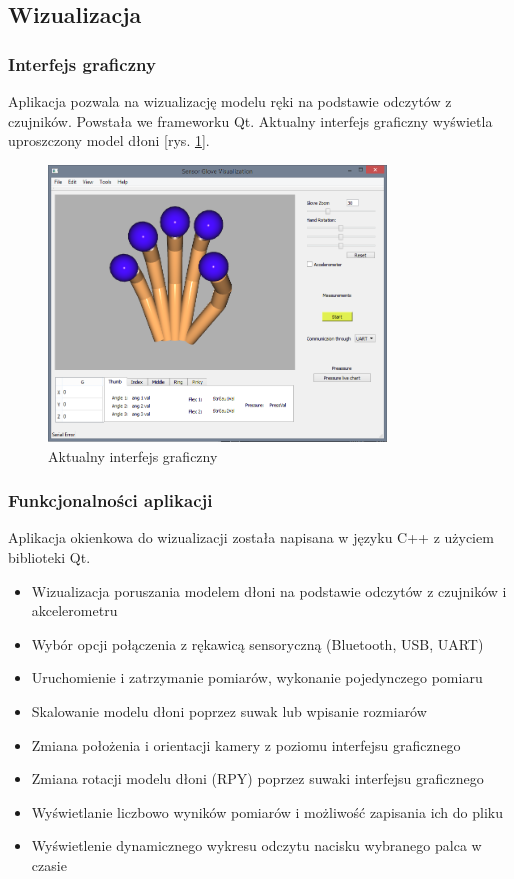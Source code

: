 \documentclass[12pt,a4paper]{article}
\begin{document}
\subsection{Wizualizacja}
\subsubsection{Interfejs graficzny}
Aplikacja pozwala na wizualizację modelu ręki na podstawie odczytów z czujników. Powstała we frameworku Qt. Aktualny interfejs graficzny wyświetla uproszczony model dłoni [rys. \ref{fig:wds}].

\begin{figure}[!htb]
\centering
\includegraphics[width=0.8\textwidth]{images/aktualnyinterfejsgraficzny.png}
\caption{Aktualny interfejs graficzny}
\label{fig:wds}
\end{figure}

\subsubsection{Funkcjonalności aplikacji}
Aplikacja okienkowa do wizualizacji została napisana w języku C++ z użyciem biblioteki Qt.
\begin{itemize}
\item Wizualizacja poruszania modelem dłoni na podstawie odczytów z czujników i akcelerometru
\item Wybór opcji połączenia z rękawicą sensoryczną (Bluetooth, USB, UART)
\item Uruchomienie i zatrzymanie pomiarów, wykonanie pojedynczego pomiaru
\item Skalowanie modelu dłoni poprzez suwak lub wpisanie rozmiarów
\item Zmiana położenia i orientacji kamery z poziomu interfejsu graficznego
\item Zmiana rotacji modelu dłoni (RPY) poprzez suwaki interfejsu graficznego
\item Wyświetlanie liczbowo wyników pomiarów i możliwość zapisania ich do pliku
\item Wyświetlenie dynamicznego wykresu odczytu nacisku wybranego palca w czasie
\end{itemize}
\end{document}
